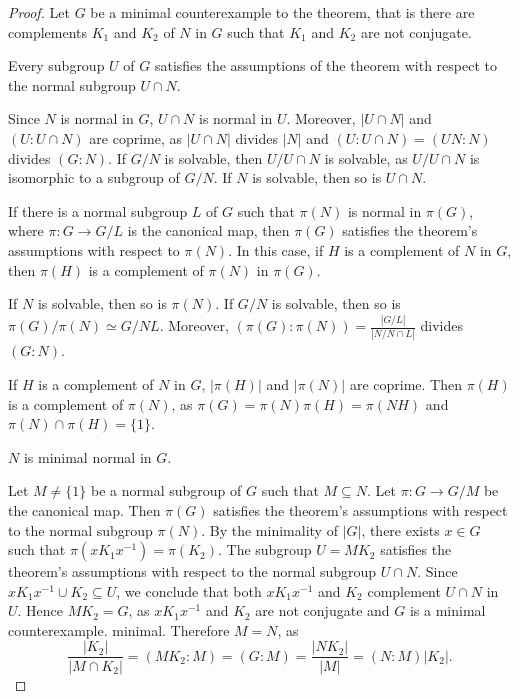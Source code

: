 \begin{proof}
	Let $G$ be a minimal counterexample to the theorem, that is there are complements $K_1$ and 
	$K_2$ of $N$ in $G$ such that $K_1$ and $K_2$ are not conjugate. 

	\begin{claim}
		Every subgroup $U$ of $G$ satisfies the assumptions of the theorem with respect to the normal subgroup 
        $U\cap N$.
	\end{claim}
	
	Since $N$ is normal in $G$, $U\cap N$ is normal in $U$. Moreover, $|U\cap N|$ and 
	$(U:U\cap N)$ are coprime, as $|U\cap N|$ divides $|N|$ and $(U:U\cap
	N)=(UN:N)$ divides $(G:N)$.  If $G/N$ is solvable, then $U/U\cap N$
	is solvable, as $U/U\cap N$ is isomorphic to a subgroup of $G/N$. If $N$ is 
	solvable, then so is $U\cap N$.
%

	\begin{claim}
		If there is a normal subgroup $L$ of $G$ such that $\pi(N)$ is normal in 
		$\pi(G)$, where $\pi\colon G\to G/L$ is the canonical map, then 
    	$\pi(G)$ satisfies the theorem's assumptions with respect to $\pi(N)$.
		In this case, if $H$  is a complement of $N$ in $G$, then $\pi(H)$ 
		is a complement of $\pi(N)$ in $\pi(G)$.
	\end{claim}

	If $N$ is solvable, then so is $\pi(N)$. If $G/N$ is solvable, then so is 
	$\pi(G)/\pi(N)\simeq G/NL$. Moreover, 
	$(\pi(G):\pi(N))=\frac{|G/L|}{|N/N\cap L|}$ divides $(G:N)$. 
	
	If $H$ is a complement of $N$ in $G$, $|\pi(H)|$ and $|\pi(N)|$ are 
	coprime. Then $\pi(H)$ is a complement of $\pi(N)$, as 
	$\pi(G)=\pi(N)\pi(H)=\pi(NH)$ and 
	$\pi(N)\cap\pi(H)=\{1\}$. 

	\begin{claim}
		$N$ is minimal normal in $G$.
	\end{claim}

	Let $M\ne\{1\}$ be a normal subgroup of $G$ such that $M\subseteq N$. Let $\pi\colon G\to G/M$ be the canonical map. 
	Then $\pi(G)$ satisfies the theorem's assumptions with respect to the normal subgroup 
	$\pi(N)$. By the minimality of $|G|$, there exists 
	$x\in G$ such that $\pi(xK_1x^{-1})=\pi(K_2)$. The subgroup 
	$U=MK_2$ satisfies the theorem's assumptions with respect to the normal subgroup 
	$U\cap N$. Since $xK_1x^{-1}\cup K_2\subseteq U$,
	we conclude that both $xK_1x^{-1}$ and $K_2$ complement $U\cap N$ in $U$.
	Hence $MK_2=G$, as $xK_1x^{-1}$ and $K_2$ are not conjugate and $G$ is a minimal counterexample. 
	minimal. Therefore $M=N$, as 
	\[
		\frac{|K_2|}{|M\cap K_2|}=(MK_2:M)=(G:M)=\frac{|NK_2|}{|M|}=(N:M)|K_2|.
	\]


\end{proof}

